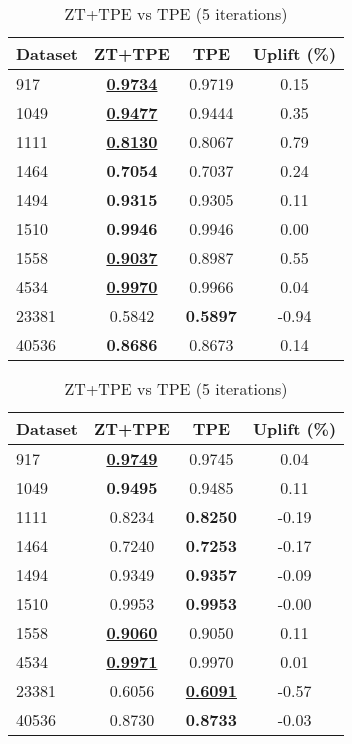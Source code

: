 \begin{table}[htbp]
\begin{center}
\begin{small}
\begin{sc}
\begin{subtable}[t]{0.48\textwidth}
    \centering
    \caption{ZT+TPE vs TPE (1 iteration)}
    \label{tab:xgboost-optuna-1}
    \begin{tabular}{lccc}
    \toprule
    \textbf{Dataset} & \textbf{ZT+TPE} & \textbf{TPE} & \textbf{Uplift (\%)} \\
    \midrule
    917    & \underline{\textbf{0.9734}} & 0.9719 & 0.15 \\
    1049    & \underline{\textbf{0.9477}} & 0.9444 & 0.35 \\
    1111    & \underline{\textbf{0.8130}} & 0.8067 & 0.79 \\
    1464    & \textbf{0.7054} & 0.7037 & 0.24 \\
    1494    & \textbf{0.9315} & 0.9305 & 0.11 \\
    1510    & \textbf{0.9946} & 0.9946 & 0.00 \\
    1558    & \underline{\textbf{0.9037}} & 0.8987 & 0.55 \\
    4534    & \underline{\textbf{0.9970}} & 0.9966 & 0.04 \\
    23381    & 0.5842 & \textbf{0.5897} & -0.94 \\
    40536    & \textbf{0.8686} & 0.8673 & 0.14 \\
    \bottomrule
    \end{tabular}
\end{subtable}
\hfill
\begin{subtable}[t]{0.48\textwidth}
    \centering
    \caption{ZT+TPE vs TPE (5 iterations)}
    \label{tab:xgboost-optuna-5}
    \begin{tabular}{lccc}
    \toprule
    \textbf{Dataset} & \textbf{ZT+TPE} & \textbf{TPE} & \textbf{Uplift (\%)} \\
    \midrule
    917    & \underline{\textbf{0.9749}} & 0.9745 & 0.04 \\
    1049    & \textbf{0.9495} & 0.9485 & 0.11 \\
    1111    & 0.8234 & \textbf{0.8250} & -0.19 \\
    1464    & 0.7240 & \textbf{0.7253} & -0.17 \\
    1494    & 0.9349 & \textbf{0.9357} & -0.09 \\
    1510    & 0.9953 & \textbf{0.9953} & -0.00 \\
    1558    & \underline{\textbf{0.9060}} & 0.9050 & 0.11 \\
    4534    & \underline{\textbf{0.9971}} & 0.9970 & 0.01 \\
    23381    & 0.6056 & \underline{\textbf{0.6091}} & -0.57 \\
    40536    & 0.8730 & \textbf{0.8733} & -0.03 \\
    \bottomrule
    \end{tabular}
\end{subtable}


\end{sc}
\end{small}
\end{center}
\end{table}

